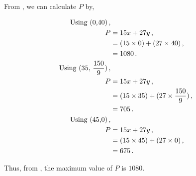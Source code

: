 \begin{subquestions}
\begin{center}

\end{center}


\subquestion

From , we can calculate $P$ by,

\begin{align}
	\text{Using (0,40)} \,, \nonumber \\
	P & = 15x + 27y \,, \nonumber \\
	  & = (15 \times 0) + (27 \times 40) \,, \nonumber \\
	  & = 1080 \,. \label{2008:q1:eqn:Profit} \\
	\text{Using (35, $\frac{150}{9})$} \,, \nonumber \\
	P & = 15x + 27y \,, \nonumber \\
	  & = (15 \times 35) + (27 \times \frac{150}{9}) \,, \nonumber \\
	  & = 705 \,.    \\		  
	\text{Using (45,0)} \,, \nonumber \\
	P & = 15x + 27y \,, \nonumber \\
	  & = (15 \times 45) + (27 \times 0) \,, \nonumber \\
	  & = 675 \,. 
\end{align}

Thus, from , the maximum value of $P$ is $1080$.

\end{subquestions}

